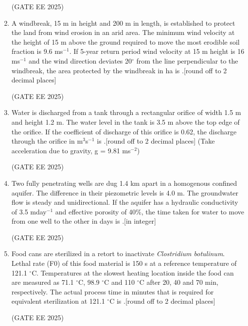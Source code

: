 \documentclass[journal,12pt,onecolumn]{IEEEtran}
\theoremstyle{remark}
\begin{document}
\begin{enumerate}
\hfill(GATE EE 2025)

\item A windbreak, 15 m in height and 200 m in length, is established to protect the land from wind erosion in an arid area. The minimum wind velocity at the height of 15 m above the ground required to move the most erodible soil fraction is 9.6 ms$^{-1}$. If 5-year return period wind velocity at 15 m height is 16 ms$^{-1}$ and the wind direction deviates 20$^\circ$ from the line perpendicular to the windbreak, the area protected by the windbreak in ha is \underline{\hspace{2cm}}.{[round off to 2 decimal places]}

\hfill(GATE EE 2025)

\item Water is discharged from a tank through a rectangular orifice of width 1.5 m and height 1.2 m. The water level in the tank is 3.5 m above the top edge of the orifice. If the coefficient of discharge of this orifice is 0.62, the discharge through the orifice in m$^3$s$^{-1}$ is \underline{\hspace{2cm}}.{[round off to 2 decimal places]} 
(Take acceleration due to gravity, g = 9.81 ms$^{-2}$)

\hfill(GATE EE 2025)

\item Two fully penetrating wells are dug 1.4 km apart in a homogenous confined aquifer. The difference in their piezometric levels is 4.0 m. The groundwater flow is steady and unidirectional. If the aquifer has a hydraulic conductivity of 3.5 mday$^{-1}$ and effective porosity of 40\%, the time taken for water to move from one well to the other in days is \underline{\hspace{2cm}}.{[in integer]}

\hfill(GATE EE 2025)

\item Food cans are sterilized in a retort to inactivate \textit{Clostridium botulinum}. Lethal rate (F$0$) of this food material is 150 s at a reference temperature of 121.1 $^\circ$C. Temperatures at the slowest heating location inside the food can are measured as 71.1 $^\circ$C, 98.9 $^\circ$C and 110 $^\circ$C after 20, 40 and 70 min, respectively. The actual process time in minutes that is required for equivalent sterilization at 121.1 $^\circ$C is \underline{\hspace{2cm}}.{[round off to 2 decimal places]}

\hfill(GATE EE 2025)


\end{enumerate}
\end{document}
